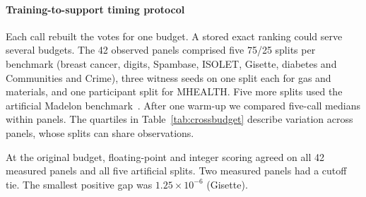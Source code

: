 \paragraph{Training-to-support timing protocol}
Each call rebuilt the votes for one budget. A stored exact ranking could serve several budgets. The 42 observed panels comprised five 75/25 splits per benchmark (breast cancer, digits, Spambase, ISOLET, Gisette, diabetes and Communities and Crime), three witness seeds on one split each for gas and materials, and one participant split for MHEALTH. Five more splits used the artificial Madelon benchmark~\citep{guyon2004challenge}. After one warm-up we compared five-call medians within panels. The quartiles in Table~\ref{tab:crossbudget} describe variation across panels, whose splits can share observations.

At the original budget, floating-point and integer scoring agreed on all 42 measured panels and all five artificial splits. Two measured panels had a cutoff tie. The smallest positive gap was $1.25\times10^{-6}$ (Gisette).
